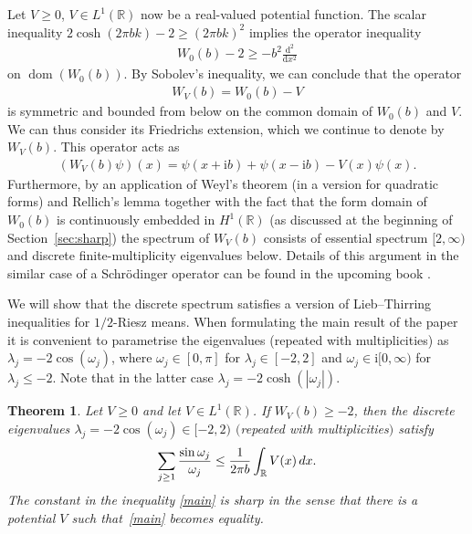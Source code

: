 \documentclass[11pt]{article}
\numberwithin{equation}{section}
\numberwithin{equation}{section}
\newtheorem{Theorem}{Theorem}[section]
\newcommand{\ii}{\mathrm{i}}
\newcommand{\R}{\mathbb{R}}
\DeclareMathOperator{\dom}{dom}
\begin{document}
Let $V\ge0$, $V\in L^1(\R)$ now be a real-valued potential function. The scalar inequality $2\cosh(2\pi b k)-2\ge (2\pi b k)^2$ implies the operator inequality
\begin{gather}
W_0(b)-2\ge-b^2\frac{\mathrm{d}^2}{\mathrm{d}x^2}
\label{WH}
\end{gather}
on $\dom(W_0(b))$. By Sobolev's inequality, we can conclude that the operator
\begin{gather*}%
W_V(b)=W_0(b)- V
\end{gather*}
is symmetric and bounded from below on the common domain of $W_0(b)$ and $V$.
We can thus consider its Friedrichs extension, which we continue to denote by $W_V(b)$. This operator acts as
\begin{gather*}
(W_V(b)\psi)(x)=\psi(x+\ii b)+\psi(x-\ii b)-V(x)\psi(x).
\end{gather*}
Furthermore, by an application of Weyl's theorem (in a version for quadratic forms) and Rellich's lemma together with the fact that the form domain of $W_0(b)$ is continuously embedded in $H^1(\R)$ (as discussed at the beginning of Section~\ref{sec:sharp}) the spectrum of $W_V(b)$ consists of essential spectrum $[2,\infty)$ and discrete finite-multiplicity eigenvalues below. Details of this argument in the similar case of a Schr\"odinger operator can be found in the upcoming book \cite[Proposition 4.14]{FLW}.

We will show that the discrete spectrum satisfies a version of Lieb--Thirring inequalities for $1/2$-Riesz means.
When formulating the main result of the paper it is convenient to parametrise the eigenvalues (repeated with multiplicities) as $\lambda_j = - 2\cos(\omega_j)$, where $\omega_j\in [0,\pi]$ for
$\lambda_j\in[-2,2]$ and $\omega_j\in \ii [0,\infty)$ for $\lambda_j\le -2$.
Note that in the latter case $\lambda_j = - 2\cosh(|\omega_j|)$.

\begin{Theorem}\label{1}
Let $V\ge 0$ and let $V\in L^1(\mathbb R)$. If $W_V(b)\ge-2$, then
the discrete eigenvalues $\lambda_j=-2\cos(\omega_j)\in [-2,2)$ $($repeated with multiplicities$)$ satisfy
\begin{gather}\label{main}
\sum_{j\ge1}\frac{\sin\omega_j}{\omega_j}\le \frac{1}{2\pi b}\int_{\R}V(x) \, {\rm d} x.
\end{gather}
The constant in the inequality \eqref{main} is sharp in the sense that there is a potential
$V$ such that~\eqref{main} becomes equality.
\end{Theorem}
\end{document}
